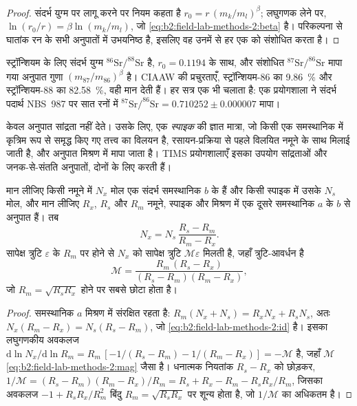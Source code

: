 \begin{proof}
संदर्भ युग्म पर लागू करने पर नियम कहता है $r_0 = r\,(m_k/m_l)^\beta$; लघुगणक लेने पर,
$\ln(r_0/r) = \beta\ln(m_k/m_l)$, जो \eqref{eq:b2:field-lab-methods-2:beta} है। परिकल्पना से घातांक
रन के सभी अनुपातों में उभयनिष्ठ है, इसलिए वह उनमें से हर एक को संशोधित करता है।
\end{proof}

स्ट्रॉन्शियम के लिए संदर्भ युग्म $^{86}\mathrm{Sr}/^{88}\mathrm{Sr}$ है, $r_0 = 0.1194$ के साथ, और
संशोधित $^{87}\mathrm{Sr}/^{86}\mathrm{Sr}$ मापा गया अनुपात गुणा
$(m_{87}/m_{86})^\beta$ है। CIAAW की प्रचुरताएँ, स्ट्रॉन्शियम-86 का \qty{9.86}{\percent} और
स्ट्रॉन्शियम-88 का \qty{82.58}{\percent}, वही मान देती हैं। हर सत्र एक  भी चलाता है: एक प्रयोगशाला ने संदर्भ पदार्थ NBS~987 पर सात रनों में $^{87}\mathrm{Sr}/^{86}\mathrm{Sr} = 0.710252 \pm
0.000007$ मापा।

केवल अनुपात सांद्रता नहीं देते। उसके लिए, एक \emph{स्पाइक} की ज्ञात मात्रा, जो किसी एक समस्थानिक में
कृत्रिम रूप से समृद्ध किए गए तत्त्व का विलयन है, रसायन-प्रक्रिया से पहले विलयित नमूने के साथ मिलाई जाती है,
और अनुपात मिश्रण में मापा जाता है। TIMS प्रयोगशालाएँ इसका उपयोग सांद्रताओं
और जनक-से-संतति अनुपातों, दोनों के लिए करती हैं।

\begin{proposition}\label{prop:b2:field-lab-methods-2:id}
मान लीजिए किसी नमूने में $N_x$ मोल एक संदर्भ समस्थानिक $b$ के हैं और किसी स्पाइक में उसके $N_s$ मोल, और मान लीजिए
$R_x$, $R_s$ और $R_m$ नमूने, स्पाइक और मिश्रण में एक दूसरे समस्थानिक $a$ के $b$ से
अनुपात हैं। तब
\begin{equation}
N_x = N_s\,\frac{R_s - R_m}{R_m - R_x} .
\label{eq:b2:field-lab-methods-2:id}
\end{equation}
सापेक्ष त्रुटि $\varepsilon$ के $R_m$ पर होने से $N_x$ को सापेक्ष त्रुटि $\mathcal{M}\varepsilon$ मिलती है,
जहाँ त्रुटि-आवर्धन है
\begin{equation}
\mathcal{M} = \frac{R_m\,(R_s - R_x)}{(R_s - R_m)(R_m - R_x)} ,
\label{eq:b2:field-lab-methods-2:mag}
\end{equation}
जो $R_m = \sqrt{R_s R_x}$ होने पर सबसे छोटा होता है।
\end{proposition}

\begin{proof}
समस्थानिक $a$ मिश्रण में संरक्षित रहता है: $R_m(N_x + N_s) = R_x N_x + R_s N_s$, अतः $N_x(R_m - R_x) =
N_s(R_s - R_m)$, जो \eqref{eq:b2:field-lab-methods-2:id} है। इसका लघुगणकीय अवकलज
$\mathrm{d}\ln N_x/\mathrm{d}\ln R_m = R_m\,[-1/(R_s - R_m) - 1/(R_m - R_x)] = -\mathcal{M}$ है, जहाँ
$\mathcal{M}$ \eqref{eq:b2:field-lab-methods-2:mag} जैसा है। धनात्मक नियतांक $R_s - R_x$ को छोड़कर,
$1/\mathcal{M} = (R_s - R_m)(R_m - R_x)/R_m = R_s + R_x - R_m - R_sR_x/R_m$, जिसका अवकलज
$-1 + R_sR_x/R_m^2$ बिंदु $R_m = \sqrt{R_sR_x}$ पर शून्य होता है, जो $1/\mathcal{M}$ का अधिकतम है।
\end{proof}

